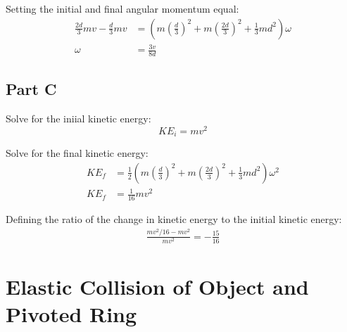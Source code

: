\documentclass{article}
\begin{document}
Setting the initial and final angular momentum equal:
\begin{align*}
    \frac{2 d}{3} m v - \frac{d}{3} m v &= \left( m \left( \frac{d}{3} \right)^2
    + m \left( \frac{2 d}{3} \right)^2 + \frac{1}{3} m d^2 \right) \omega \\
    \omega &= \frac{3 v}{8 d}
\end{align*}

\subsection*{Part C}

Solve for the iniial kinetic energy:
$$KE_i = m v^2$$

Solve for the final kinetic energy:
\begin{align*}
    KE_f &= \frac{1}{2} \left( m \left( \frac{d}{3} \right)^2 + m \left( \frac{2 d}{3}
    \right)^2 + \frac{1}{3} m d^2 \right) \omega^2 \\
    KE_f &= \frac{1}{16} m v^2
\end{align*}

Defining the ratio of the change in kinetic energy to the initial kinetic
energy:
\begin{align*}
    \frac{ m v^2/16 - m v^2}{m v^2} = -\frac{15}{16}
\end{align*}

\section{Elastic Collision of Object and Pivoted Ring}
\end{document}
